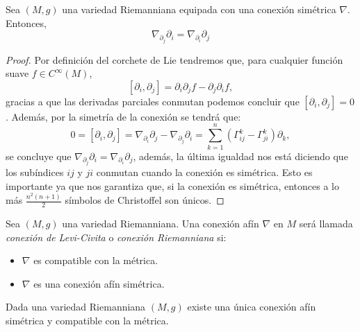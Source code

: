 \begin{lemma}
	Sea $(M,g)$ una variedad Riemanniana equipada con una conexión simétrica $\nabla$. Entonces,
	\[
		\nabla_{\partial_{j}}\partial_{i} = \nabla_{\partial_{i}}\partial_{j}
	\]
\end{lemma}

\begin{proof}
	Por definición del corchete de Lie tendremos que, para cualquier función suave $f \in C^{\infty}(M)$,
	\[
		[\partial_{i},\partial_{j}] = \partial_{i}\partial_{j} f - \partial_{j}\partial_{i}f,
	\]
	gracias a que las derivadas parciales conmutan podemos concluir que $[\partial_{i},\partial_{j}] = 0$. Además, por la simetría de la conexión se tendrá que:
	\[
		0 = [\partial_{i},\partial_{j}] =
		\nabla_{\partial_{i}} \partial_{j} -  \nabla_{\partial_{j}} \partial_{i}
		= \sum_{k=1}^{n} (\Gamma_{ij}^{k} - \Gamma_{ji}^{k}) \partial_{k},
	\]
	se concluye que $\nabla_{\partial_{j}}\partial_{i} = \nabla_{\partial_{i}}\partial_{j}$, además, la última igualdad nos está diciendo que los subíndices $ij$ y $ji$ conmutan cuando la conexión es simétrica. Esto es importante ya que nos garantiza que, si la conexión es simétrica, entonces a lo más $\frac{n^{2}(n+1)}{2}$ símbolos de Christoffel son únicos.
\end{proof}

\begin{definition}
	Sea $(M,g)$ una variedad Riemanniana. Una conexión afín $\nabla$ en $M$ será llamada \textit{conexión de Levi-Civita} o \textit{conexión Riemanniana} si:
	\begin{itemize}
		\item $\nabla$ es compatible con la métrica.
		\item $\nabla$ es una conexión afín simétrica.
	\end{itemize}
\end{definition}

\begin{theorem}
	Dada una variedad Riemanniana $(M,g)$ existe una única conexión afín simétrica y compatible con la métrica.
\end{theorem}

